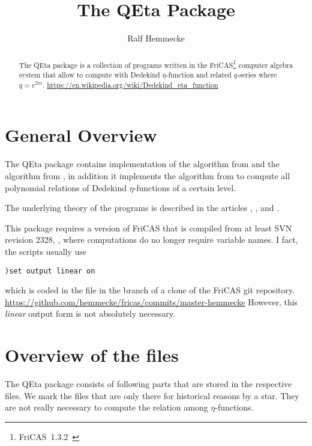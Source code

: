 \documentclass{article}
\begin{document}
\title{The QEta Package}
\author{Ralf Hemmecke}
\maketitle
\begin{abstract}
  The QEta package is a collection of programs written in the
  FriCAS\footnote{FriCAS~1.3.2~\cite{FriCAS}} computer algebra system
  that allow to compute with Dedekind $\eta$-function and related
  $q$-series where $q=e^{2\pi i}$.
  \url{https://en.wikipedia.org/wiki/Dedekind_eta_function}
\end{abstract}

\tableofcontents

\section{General Overview}

The QEta package contains implementation of the  algorithm
from \cite{Radu:RamanujanKolberg:2015} and the \algoSamba{} algorithm
from \cite{Hemmecke:DancingSambaRamanujan:2018}, in addition it
implements the algorithm from \cite{Hemmecke+Radu:EtaRelations:2018}
to compute all polynomial relations of Dedekind $\eta$-functions of a
certain level.

The underlying theory of the programs is described in the articles
\cite{Radu:RamanujanKolberg:2015},
\cite{Hemmecke:DancingSambaRamanujan:2018}, and
\cite{Hemmecke+Radu:EtaRelations:2018}.

This package requires a version of FriCAS that is compiled from at
least SVN revision 2328, \ie, where \GB{} computations do no longer
require variable names. I fact, the scripts usually use
\begin{verbatim}
)set output linear on
\end{verbatim}
which is coded in the file  in the
 branch of a clone of the FriCAS git repository.
\url{https://github.com/hemmecke/fricas/commits/master-hemmecke}
However, this \emph{linear} output form is not absolutely necessary.

\section{Overview of the files}

The QEta package consists of following parts that are stored in the
respective  files. We mark the files that are only
there for historical reasons by a star. They are not really necessary
to compute the relation among $\eta$-functions.




\end{document}
